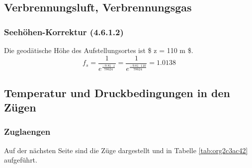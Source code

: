 \documentclass[a4paper,10pt,twoside]{article}
\begin{document}
\subsection{Verbrennungsluft, Verbrennungsgas}
\label{sec:org5fbf91f}
\subsubsection{Seehöhen-Korrektur (4.6.1.2)}
\label{sec:org25f4c5f}
Die geodätische Höhe des Aufstellungsortes ist \$ z = 110 m \$.
\begin{equation}
f_s = \frac{1}{e^\frac{-9.81 \cdot z}{78624}} = \frac{1}{e^\frac{-9.81 \cdot 110}{78624}} = 1.0138 
\end{equation}

\subsection{Temperatur und Druckbedingungen in den Zügen}
\label{sec:orge0431e0}
\subsubsection{Zuglaengen}
\label{sec:orge6e2029}
Auf der nächsten Seite sind die Züge dargestellt und
in Tabelle \ref{tab:org2c3ac42} aufgeführt.    

\end{document}
